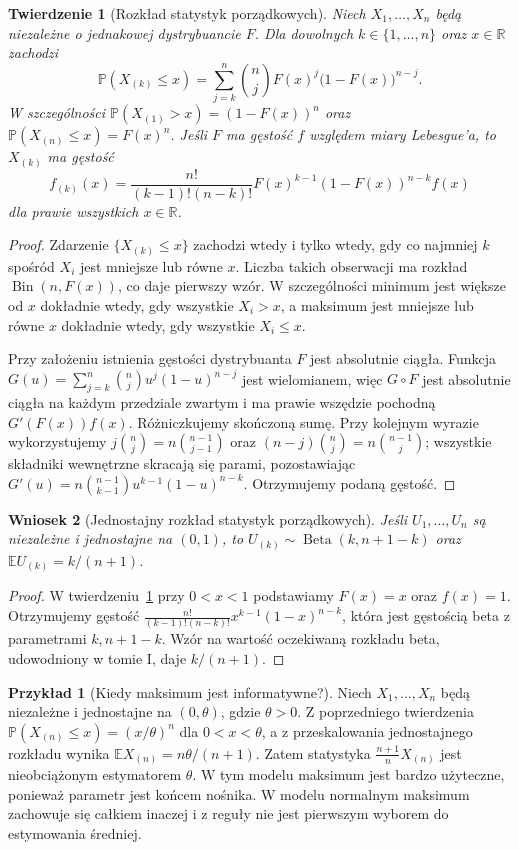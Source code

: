 \documentclass[11pt,a4paper,oneside]{report}
\numberwithin{equation}{chapter}
\theoremstyle{plain}
\newtheorem{twierdzenie}{Twierdzenie}[chapter]
\newtheorem{wniosek}[twierdzenie]{Wniosek}
\theoremstyle{definition}
\newtheorem{przyklad}{Przykład}[chapter]
\theoremstyle{remark}
\newcommand{\R}{\mathbb R}
\newcommand{\Prob}{\mathbb P}
\newcommand{\E}{\mathbb E}
\DeclareMathOperator{\Bin}{Bin}
\begin{document}
\begin{twierdzenie}[Rozkład statystyk porządkowych]\label{thm:order-cdf}
Niech $X_1,\ldots,X_n$ będą niezależne o jednakowej dystrybuancie $F$. Dla dowolnych $k\in\{1,\ldots,n\}$ oraz $x\in\R$ zachodzi
\[
\Prob(X_{(k)}\le x)=\sum_{j=k}^n\binom nj F(x)^j\bigl(1-F(x)\bigr)^{n-j}.
\]
W szczególności $\Prob(X_{(1)}>x)=(1-F(x))^n$ oraz $\Prob(X_{(n)}\le x)=F(x)^n$. Jeśli $F$ ma gęstość $f$ względem miary Lebesgue'a, to $X_{(k)}$ ma gęstość
\[
f_{(k)}(x)=\frac{n!}{(k-1)!(n-k)!}F(x)^{k-1}(1-F(x))^{n-k}f(x)
\]
dla prawie wszystkich $x\in\R$.
\end{twierdzenie}
\begin{proof}
Zdarzenie $\{X_{(k)}\le x\}$ zachodzi wtedy i tylko wtedy, gdy co najmniej $k$ spośród $X_i$ jest mniejsze lub równe $x$. Liczba takich obserwacji ma rozkład $\Bin(n,F(x))$, co daje pierwszy wzór. W szczególności minimum jest większe od $x$ dokładnie wtedy, gdy wszystkie $X_i>x$, a maksimum jest mniejsze lub równe $x$ dokładnie wtedy, gdy wszystkie $X_i\le x$.

Przy założeniu istnienia gęstości dystrybuanta $F$ jest absolutnie ciągła. Funkcja $G(u)=\sum_{j=k}^n\binom nj u^j(1-u)^{n-j}$ jest wielomianem, więc $G\circ F$ jest absolutnie ciągła na każdym przedziale zwartym i ma prawie wszędzie pochodną $G'(F(x))f(x)$. Różniczkujemy skończoną sumę. Przy kolejnym wyrazie wykorzystujemy $j\binom nj=n\binom{n-1}{j-1}$ oraz $(n-j)\binom nj=n\binom{n-1}j$; wszystkie składniki wewnętrzne skracają się parami, pozostawiając
$G'(u)=n\binom{n-1}{k-1}u^{k-1}(1-u)^{n-k}$. Otrzymujemy podaną gęstość.
\end{proof}

\begin{wniosek}[Jednostajny rozkład statystyk porządkowych]\label{cor:uniform-beta}
Jeśli $U_1,\ldots,U_n$ są niezależne i jednostajne na $(0,1)$, to $U_{(k)}\sim\operatorname{Beta}(k,n+1-k)$ oraz $\E U_{(k)}=k/(n+1)$.
\end{wniosek}
\begin{proof}
W twierdzeniu~\ref{thm:order-cdf} przy $0<x<1$ podstawiamy $F(x)=x$ oraz $f(x)=1$. Otrzymujemy gęstość $\frac{n!}{(k-1)!(n-k)!}x^{k-1}(1-x)^{n-k}$, która jest gęstością beta z parametrami $k,n+1-k$. Wzór na wartość oczekiwaną rozkładu beta, udowodniony w tomie I, daje $k/(n+1)$.
\end{proof}

\begin{przyklad}[Kiedy maksimum jest informatywne?]\label{ex:max-uniform}
Niech $X_1,\ldots,X_n$ będą niezależne i jednostajne na $(0,\theta)$, gdzie $\theta>0$. Z poprzedniego twierdzenia $\Prob(X_{(n)}\le x)=(x/\theta)^n$ dla $0<x<\theta$, a z przeskalowania jednostajnego rozkładu wynika $\E X_{(n)}=n\theta/(n+1)$. Zatem statystyka $\frac{n+1}{n}X_{(n)}$ jest nieobciążonym estymatorem $\theta$. W tym modelu maksimum jest bardzo użyteczne, ponieważ parametr jest końcem nośnika. W modelu normalnym maksimum zachowuje się całkiem inaczej i z reguły nie jest pierwszym wyborem do estymowania średniej.
\end{przyklad}
\end{document}
